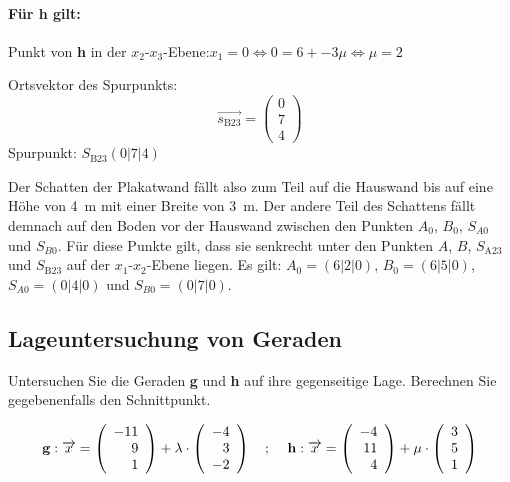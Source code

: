 \documentclass{ajc}
\numberwithin{equation}{subsection}
\begin{document}
	\paragraph{Für h gilt:} 
	
	Punkt von \textbf{h} in der $x_2\text{-}x_3$-Ebene:\quad $x_1 = 0 \Leftrightarrow 0 = 6 + -3 \mu \Leftrightarrow \mu = 2$
	
	Ortsvektor des Spurpunkts: 
	\begin{equation}
		\overrightarrow{s_\text{B23}}=\left(\begin{array}{r} 0 \\ 7 \\ 4\end{array}\right)
	\end{equation}
	Spurpunkt: $S_\text{B23}(0|7|4)$
	
	Der Schatten der Plakatwand fällt also zum Teil auf die Hauswand bis auf eine Höhe von \SI{4}{\meter} mit einer Breite von \SI{3}{\meter}. Der andere Teil des Schattens fällt demnach auf den Boden vor der Hauswand zwischen den Punkten $A_0$, $B_0$, $S_{A0}$ und $S_{B0}$. Für diese Punkte gilt, dass sie senkrecht unter den Punkten $A$, $B$, $S_\text{A23}$ und $S_\text{B23}$ auf der $x_1\text{-}x_2$-Ebene liegen. Es gilt: $A_0 = (6|2|0)$, $B_0 = (6|5|0)$, $S_{A0} = (0|4|0)$ und $S_{B0} = (0|7|0)$.
	
	\subsection{Lageuntersuchung von Geraden}
	Untersuchen Sie die Geraden \textbf{g} und \textbf{h} auf ihre gegenseitige Lage. Berechnen Sie gegebenenfalls den Schnittpunkt.
	
	\begin{equation}
		\mathbf{g}: \overrightarrow{x}=\left(\begin{array}{r} -11 \\ 9 \\ 1\end{array}\right) + \lambda \cdot \left(\begin{array}{r} -4 \\ 3 \\ -2\end{array}\right) \text{\quad ; \quad} \mathbf{h}: \overrightarrow{x}=\left(\begin{array}{r} -4 \\ 11 \\ 4\end{array}\right) + \mu \cdot \left(\begin{array}{r} 3 \\ 5 \\ 1\end{array}\right)
	\end{equation}
	
\end{document}

